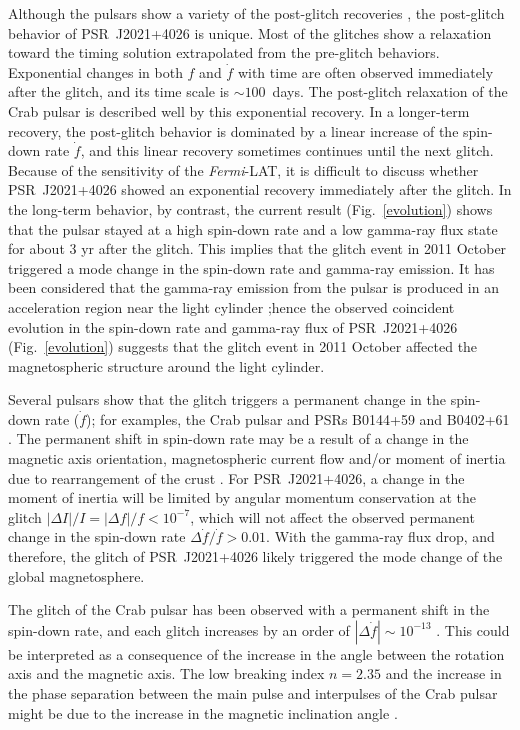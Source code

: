 \documentclass[12pt,preprint]{aastex}
\begin{document}
Although the pulsars show a variety of the post-glitch recoveries \citep{yua10,esp11, yu13}, the post-glitch behavior of PSR~J2021+4026 is unique.
Most of the glitches show a relaxation toward the timing solution extrapolated from the pre-glitch
behaviors.
Exponential changes in both $f$ and $\dot{f}$ with time are often observed immediately after the glitch, and its time scale is $\sim 100$~days.
The post-glitch relaxation of the Crab pulsar is  described well  by this exponential recovery. 
In a longer-term recovery, the post-glitch behavior is dominated by a linear increase of the spin-down rate $\dot{f}$, and this linear recovery sometimes continues until the next glitch.
Because of the sensitivity of the \emph{Fermi}-LAT, it is difficult to discuss whether PSR~J2021+4026 showed an exponential recovery immediately after the glitch.
In the long-term behavior, by contrast, the current result (Fig.~\ref{evolution}) shows that the pulsar stayed at a high spin-down rate and a low gamma-ray flux state for about 3 yr after the glitch. 
This implies that the glitch event in 2011 October triggered a mode change in the spin-down rate and gamma-ray emission.  
It has been considered that the gamma-ray emission from the pulsar is produced in an acceleration region near the light cylinder \citep{abdo09c};hence the observed coincident evolution in the spin-down rate and gamma-ray flux of PSR~J2021+4026 (Fig.~\ref{evolution}) suggests that the glitch event in 2011 October affected the magnetospheric structure around the light cylinder.

Several pulsars show  that the glitch triggers a permanent change in the spin-down rate ($\dot{f}$); for examples, the Crab pulsar \citep{lyn13, lyn15} and
PSRs B0144+59 and B0402+61 \citep{yua10, yu13}.  
The permanent shift in spin-down rate may be  a result of a  change in
the magnetic axis orientation,   magnetospheric current flow and/or  moment of inertia due to rearrangement of the crust \citep{rud98, ant15}.
For PSR~J2021+4026, a change in the moment of inertia will be limited by  angular momentum conservation at the glitch $|\Delta I|/I=|\Delta f|/f< 10^{-7}$, which will not affect the observed permanent change in the spin-down rate $\Delta \dot{f}/\dot{f}>0.01$.
With the gamma-ray flux drop, and therefore, the glitch of PSR~J2021+4026 likely triggered the mode change of the global magnetosphere.

The glitch of the Crab pulsar has been observed with a permanent shift in the spin-down rate, and each glitch increases by an order of $|\Delta \dot{f}|\sim 10^{-13}$ \citep{lyn15}.
This could be interpreted as a consequence of the increase in the angle between the rotation axis and the magnetic axis.  The low breaking index $n=2.35$ and the increase in the phase separation between the main pulse  and interpulses
 of the Crab pulsar might be due to the increase in the magnetic inclination angle \citep{lyn13, lyn15}.
\end{document}
